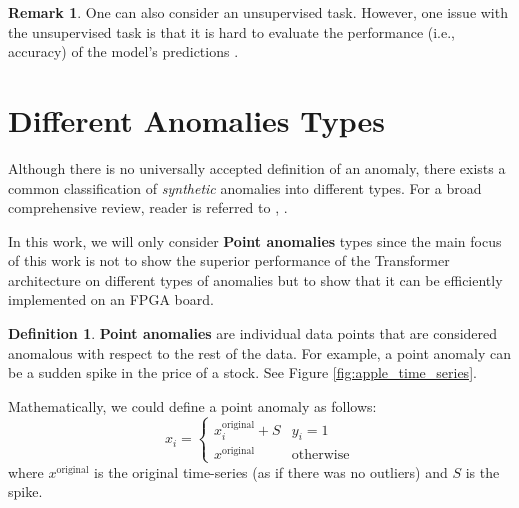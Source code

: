 \documentclass[a4paper, twoside]{report}
\theoremstyle{definition}
\newtheorem{definition}[theorem]{Definition}
\newtheorem{remark}[theorem]{Remark}
\numberwithin{equation}{section}
\begin{document}
\begin{remark}
    One can also consider an unsupervised task.
    However, one issue with the unsupervised task is that it is hard to evaluate
    the performance (i.e., accuracy) of the model's predictions \cite{1905.05667}.
\end{remark}


\section{Different Anomalies Types}

Although there is no universally accepted definition of an anomaly,
there exists a common classification of \textit{synthetic} anomalies into different types. For a broad comprehensive review,
reader is referred to \cite{Steinbuss2020GeneratingAO}, \cite{Schmidl2022AnomalyDI}.

In this work, we will only consider \textbf{Point anomalies} types since
the main focus of this work is not to show the superior performance of the Transformer architecture
on different types of anomalies
but to show that it can be efficiently implemented on an FPGA board.

\begin{definition}
    \textbf{Point anomalies} are individual data points that are considered anomalous with respect to the rest of the data.
    For example, a point anomaly can be a sudden spike in the price of a stock. See Figure \ref{fig:apple_time_series}.

    Mathematically, we could define a point anomaly as follows:
    \begin{equation}
        x_i = \begin{cases}
            x^{\text{original}}_i + S & y_i=1            \\
            x^{\text{original}}       & \text{otherwise}
        \end{cases}
    \end{equation}
    where $x^{\text{original}}$ is the original time-series (as if there was no outliers)
    and $S$ is the spike.

\end{definition}
\end{document}
